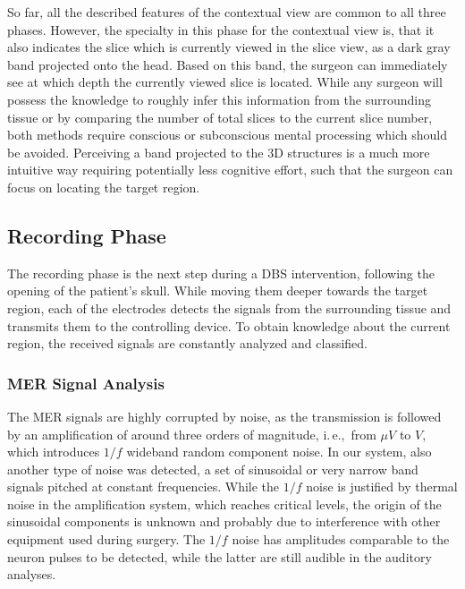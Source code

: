 \documentclass{vgtc}                          %
\begin{document}
So far, all the described features of the contextual view are common to all three phases. However, the specialty in this phase for the contextual view is, that it also indicates the slice which is currently viewed in the slice view, as a dark gray band projected onto the head. Based on this band, the surgeon can immediately see at which depth the currently viewed slice is located. While any surgeon will possess the knowledge to roughly infer this information from the surrounding tissue or by comparing the number of total slices to the current slice number, both methods require conscious or subconscious mental processing which should be avoided. Perceiving a band projected to the 3D structures is a much more intuitive way requiring potentially less cognitive effort, such that the surgeon can focus on locating the target region.


\subsection{Recording Phase}\label{sec:overview:recording}
The recording phase is the next step during a DBS intervention, following the opening of the patient's skull. While moving them deeper towards the target region, each of the electrodes detects the signals from the surrounding tissue and transmits them to the controlling device. To obtain knowledge about the current region, the received signals are constantly analyzed and classified.

\subsubsection{MER Signal Analysis}\label{sec:overview:recording:signalanalysis}
The MER signals are highly corrupted by noise, as the transmission is followed by an amplification of around three orders of magnitude, i.\,e.,~from $\mu V$ to $V$, which introduces $1/f$ wideband random component noise. In our system, also another type of noise was detected, a set of sinusoidal or very narrow band signals pitched at constant frequencies. While the $1/f$ noise is justified by thermal noise in the amplification system, which reaches critical levels, the origin of the sinusoidal components is unknown and probably due to interference with other equipment used during surgery. The $1/f$ noise has amplitudes comparable to the neuron pulses to be detected, while the latter are still audible in the auditory analyses.
\end{document}
